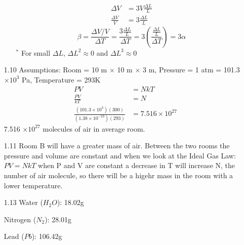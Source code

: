 \documentclass{article}
\begin{document}
\begin{enumerate}
\begin{enumerate}
\begin{align*}
                \Delta V &= 3V \frac{\Delta L}{L} \\
                \frac{\Delta V}{V} &= 3 \frac{\Delta L}{L}
            \end{align*}
            \begin{equation*}
                \beta = \frac{\Delta V / V}{\Delta T} = \frac{3 \frac{\Delta L}{L}}{\Delta T} = 3 \left(\frac{\frac{\Delta L}{L}}{\Delta T} \right) = 3 \alpha
            \end{equation*}
            \(^{\ast}\) For small \(\Delta L\), \(\Delta L^2 \approx 0\) and \(\Delta L^3 \approx 0\)
    \end{enumerate}
    \vspace{0.1in}
    \item [1.10]
    Assumptions: Room = 10 m \(\times\) 10 m \(\times\) 3 m, Pressure = 1 atm = 101.3 \(\times 10^3\) Pa, Temperature = 293\degree K
       \begin{align*}
            PV &= NkT \\
            \frac{PV}{kT} &= N \\
            \frac{(101.3 \times 10^3)(300)}{(1.38 \times 10^{-23})(293)} &= 7.516 \times 10^{27}
        \end{align*}
        7.516 \(\times 10^{27}\) molecules of air in average room.
    \vspace{0.1in}
    \item [1.11]
    Room B will have a greater mass of air. Between the two rooms the pressure and volume are constant and when we look at the Ideal Gas Law: \(PV = NkT\) when P and V are constant a decrease in T will increase N, the number of air molecule, so there will be a higehr mass in the room with a lower temperature.
    \vspace{0.1in}
    \item [1.13]
    Water (\(H_2 O\)): 18.02g

    Nitrogen (\(N_2\)): 28.01g

    Lead (\(Pb\)): 106.42g


\end{enumerate}
\end{document}
